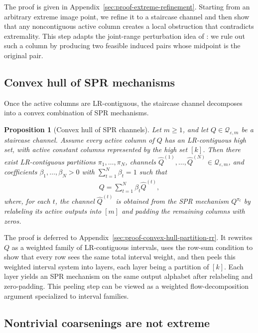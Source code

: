 \documentclass{article}
\theoremstyle{plain}
\newtheorem{proposition}[theorem]{Proposition}
\theoremstyle{definition}
\theoremstyle{plain}
\newcommand{\eps}{\varepsilon}
\begin{document}
The proof is given in Appendix~\ref{sec:proof-extreme-refinement}. Starting from an arbitrary extreme image point, we refine it to a staircase channel and then show that any noncontiguous active column creates a local obstruction that contradicts extremality. This step adapts the joint-range perturbation idea of \citet{Pensia2025BinaryTesting}: we rule out such a column by producing two feasible induced pairs whose midpoint is the original pair.

\subsection{Convex hull of SPR mechanisms}
\label{sec:geom-convex-hull}

Once the active columns are LR-contiguous, the staircase channel decomposes into a convex combination of SPR mechanisms.

\begin{proposition}[Convex hull of SPR channels]
\label{prop:convex-hull-partition-rr}
Let $m\ge 1$, and let $Q\in\mathcal Q_{\eps,m}$ be a staircase channel. Assume every active column of $Q$ has an LR-contiguous high set, with active constant columns represented by the high set $[k]$. Then there exist LR-contiguous partitions $\pi_1,\dots,\pi_N$, channels $\widehat Q^{(1)},\dots,\widehat Q^{(N)}\in\mathcal Q_{\eps,m}$, and coefficients $\beta_1,\dots,\beta_N>0$ with $\sum_{t=1}^N \beta_t=1$ such that
\begin{align}
    Q=\sum_{t=1}^N \beta_t \widehat Q^{(t)},
\end{align}
where, for each $t$, the channel $\widehat Q^{(t)}$ is obtained from the SPR mechanism $Q^{\pi_t}$ by relabeling its active outputs into $[m]$ and padding the remaining columns with zeros.
\end{proposition}

The proof is deferred to Appendix~\ref{sec:proof-convex-hull-partition-rr}. It rewrites $Q$ as a weighted family of LR-contiguous intervals, uses the row-sum condition to show that every row sees the same total interval weight, and then peels this weighted interval system into layers, each layer being a partition of $[k]$. Each layer yields an SPR mechanism on the same output alphabet after relabeling and zero-padding. This peeling step can be viewed as a weighted flow-decomposition argument \cite{Ahuja1993NetworkFlows} specialized to interval families.

\subsection{Nontrivial coarsenings are not extreme}
\label{sec:geom-coarsening}
\end{document}
